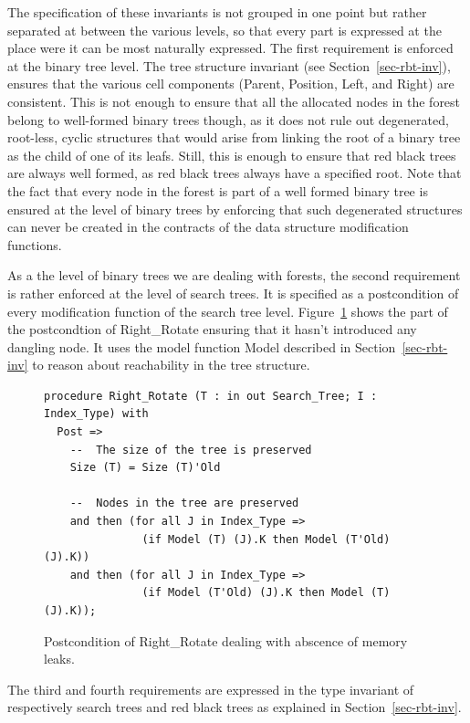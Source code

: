 \documentclass[11pt,a4paper]{article}
\begin{document}
The specification of these invariants is not grouped in one point but rather separated at between the various levels,
so that every part is expressed at the place were it can be most naturally expressed. The first requirement is
enforced at the binary tree level. The tree structure invariant (see Section~\ref{sec-rbt-inv}),
ensures that the various cell components (Parent, Position, Left, and Right) are consistent. This is not enough
to ensure that all the allocated nodes in the forest belong to well-formed binary trees though, as it does
not rule out degenerated, root-less, cyclic structures that would arise from linking the root of a binary tree as the
child of one of its leafs. Still, this is enough to ensure that red black trees are always well formed, as red black
trees always have a specified root. Note that the fact that every node in the forest is part of
a well formed binary tree is ensured at the level of binary trees by enforcing that such degenerated structures can
never be created in the contracts of the data structure modification functions.

As a the level of binary trees we are dealing with forests, the second requirement is rather enforced at the level of
search trees. It is specified as a postcondition of every modification function of the search tree level. 
Figure~\ref{fig-spec-no-leak} shows the part of the postcondtion of Right\_Rotate ensuring that it hasn't introduced
any dangling node. It uses the model function Model described in Section~\ref{sec-rbt-inv} to reason about reachability
in the tree structure.

\begin{figure}[ht]
\begin{small}
\begin{lstlisting}
procedure Right_Rotate (T : in out Search_Tree; I : Index_Type) with
  Post =>
    --  The size of the tree is preserved
    Size (T) = Size (T)'Old

    --  Nodes in the tree are preserved
    and then (for all J in Index_Type =>
               (if Model (T) (J).K then Model (T'Old) (J).K))
    and then (for all J in Index_Type =>
               (if Model (T'Old) (J).K then Model (T) (J).K));
\end{lstlisting}
\end{small}
\caption{\label{fig-spec-no-leak} Postcondition of Right\_Rotate dealing with abscence of memory leaks.}
\end{figure}

The third and fourth requirements are expressed in the type invariant of respectively search trees and red black trees
as explained in Section~\ref{sec-rbt-inv}.
\end{document}
